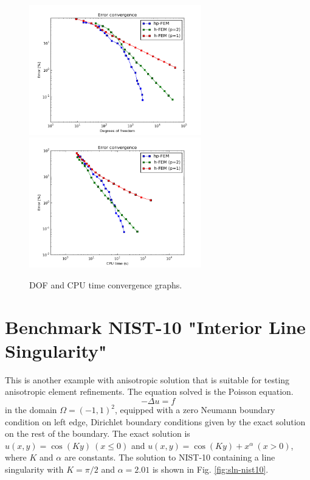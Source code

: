 \documentclass[12pt]{elsarticle}
\begin{document}
\begin{figure}[H]
\centering
\vspace{-3mm}
\hspace{-50mm}
\includegraphics[width=7.5cm]{nist/nist-9/conv_dof_aniso.png}\ \
\hspace{-10mm}
\includegraphics[width=7.5cm]{nist/nist-9/conv_cpu_aniso.png}
\hspace{-50mm}
\caption{DOF and CPU time convergence graphs.}
\label{fig:nist-9-conv}
\end{figure}


\section{Benchmark NIST-10 "Interior Line Singularity"}
\label{sec:bench-10}

This is another example with anisotropic solution that is suitable for testing
anisotropic element refinements. The equation solved is the Poisson equation.
\begin{equation} \label{interior}
-\Delta u = f
\end{equation}
in the domain $\Omega = (-1, 1)^2$, equipped with a zero
Neumann boundary condition on left edge, Dirichlet boundary
conditions given by the exact solution on the rest of the boundary.
The exact solution is
$u(x,y) = \cos(Ky)\ (x \le 0)$ and $u(x,y) = \cos(Ky) + x^{\alpha}\ (x > 0)$,
where $K$ and $\alpha$ are constants.
The solution to NIST-10 containing a line singularity with $K = \pi/2$ and
$\alpha = 2.01$ is shown in Fig. \ref{fig:sln-nist10}.
\end{document}
